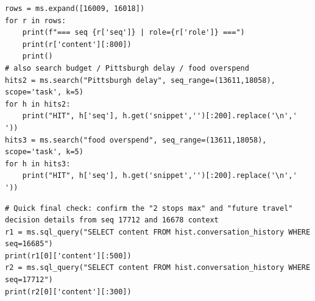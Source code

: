 \begin{lstlisting}[style=scroll, caption={Targeted expansions plus two budget searches.}, label={lst:sum-c11}]
rows = ms.expand([16009, 16018])
for r in rows:
    print(f"=== seq {r['seq']} | role={r['role']} ===")
    print(r['content'][:800])
    print()
# also search budget / Pittsburgh delay / food overspend
hits2 = ms.search("Pittsburgh delay", seq_range=(13611,18058), scope='task', k=5)
for h in hits2:
    print("HIT", h['seq'], h.get('snippet','')[:200].replace('\n',' '))
hits3 = ms.search("food overspend", seq_range=(13611,18058), scope='task', k=5)
for h in hits3:
    print("HIT", h['seq'], h.get('snippet','')[:200].replace('\n',' '))
\end{lstlisting}

\begin{lstlisting}[style=scroll, caption={Final point reads (\texttt{seq} 16685, 17712).}, label={lst:sum-c12}]
# Quick final check: confirm the "2 stops max" and "future travel" decision details from seq 17712 and 16678 context
r1 = ms.sql_query("SELECT content FROM hist.conversation_history WHERE seq=16685")
print(r1[0]['content'][:500])
r2 = ms.sql_query("SELECT content FROM hist.conversation_history WHERE seq=17712")
print(r2[0]['content'][:300])
\end{lstlisting}

